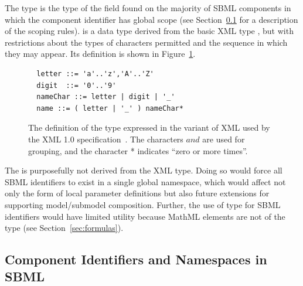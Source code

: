 \documentclass[10pt,twocolumntoc]{cekarticle}
\newcommand{\vref}[1]{\ref{#1}}
\begin{document}
The type  is the type of the  field found on the
majority of SBML components in which the component identifier has global
scope (see Section~\ref{sec:namespaces} for a description of the scoping
rules).   is a data type derived from the basic XML type
, but with restrictions about the types of characters
permitted and the sequence in which they may appear.  Its definition is
shown in Figure~\vref{fig:id}.

\begin{figure}[h]
  \vspace*{10pt}
  \centering
  \begin{minipage}{3.8in}
\begin{verbatim}
  letter ::= 'a'..'z','A'..'Z'
  digit  ::= '0'..'9'
  nameChar ::= letter | digit | '_'
  name ::= ( letter | '_' ) nameChar*
\end{verbatim}
  \end{minipage}
  \caption{The definition of the type  expressed in the variant
    of XML used by the XML 1.0 specification~\protect\citep{bray:2000}.
    The characters \( and \) are used for grouping, and the character *
    indicates ``zero or more times''.}
  \label{fig:id}
\end{figure}

The  is purposefully not derived from the XML  type.
Doing so would force all SBML identifiers to exist in a single global
namespace, which would affect not only the form of local parameter
definitions but also future extensions for supporting model/submodel
composition.  Further, the use of  type for SBML identifiers
would have limited utility because MathML  elements are not of
the type  (see Section~\ref{sec:formulas}).


\subsection{Component Identifiers and Namespaces in SBML}
\label{sec:namespaces}
\end{document}
